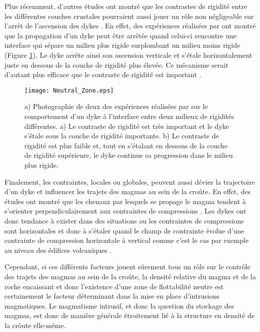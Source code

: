 Plus  récemment, d'autres  études  ont montré  que  les contrastes  de
rigidité  entre les  différentes  couches  crustales pourraient  aussi
jouer un  rôle non  négligeable sur l'arrêt  de l'ascension  des dykes
\citep{Menand:2011ki}.   En  effet,   des  expériences  réalisées  par
\citet{Kavanagh:2006ig} ont  montré que la propagation  d'un dyke peut
être  arrêtée quand  celui-ci rencontre  une interface  qui sépare  un
milieu  plus  rigide  surplombant   un  milieu  moins  rigide  (Figure
\ref{Neutral_Zone}). Le  dyke arrête ainsi son  ascension verticale et
s'étale horizontalement juste en dessous de la couche de rigidité plus
élevée. Ce mécanisme serait d'autant plus efficace que le contraste de
rigidité est important \citep{Kavanagh:2006ig}.

\begin{figure}[htpb]
  \begin{center}
    \graphicspath{ {/Users/thorey/Documents/These/Manuscript/Figure/Chapter1/} }
    \texttt{[image: Neutral\_Zone.eps]}
    \caption{a)  Photographie de  deux des  expériences réalisées  par
      \citet{Kavanagh:2006ig}   sur  le   comportement  d'un   dyke  à
      l'interface entre  deux milieux de rigidités  différentes. a) Le
      contraste de rigidité est très important et le dyke s'étale sous
      la couche de  rigidité importante.  b) Le  contraste de rigidité
      est plus faible et, tout en s'étalant en dessous de la couche de
      rigidité  supérieure, le  dyke continue  sa progression  dans le
      milieu plus rigide.}
    \label{Neutral_Zone}
  \end{center}
\end{figure}


Finalement, les contraintes, locales ou globales, peuvent aussi dévier
la trajectoire d'un dyke et influencer  les trajets des magmas au sein
de la  croûte.  En effet,  des études ont  montré que les  chenaux par
lesquels se propage le  magma tendent à s'orienter perpendiculairement
aux contraintes de  compressions \citep{Anderson:L5JA3dNN}.  Les dykes
ont donc tendance à exister dans  des situations ou les contraintes de
compressions sont  horizontales et donc  à s'étaler quand le  champ de
contrainte  évolue  d'une  contrainte  de  compression  horizontale  à
vertical  comme  c'est le  cas  par  exemple  au niveau  des  édifices
volcaniques \citep{Pinel:2000wa,Pinel:2004ji,Roman:2014hw}.

Cependant, si ces différents facteurs jouent sûrement tous un rôle sur
le contrôle  des trajets des magmas  au sein de la  croûte, la densité
relative du magma et de la  roche encaissant et donc l'existence d'une
zone de  flottabilité neutre  est certainement le  facteur déterminant
dans  la  mise  en  place  d'intrusions  magmatiques.   Le  magmatisme
intrusif, et  donc la  question du  stockage des  magmas, est  donc de
manière  générale étroitement  lié à  la  structure en  densité de  la
crôute elle-même.


